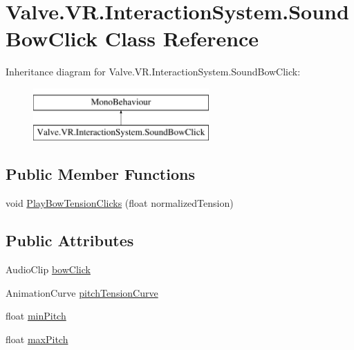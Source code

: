 \hypertarget{class_valve_1_1_v_r_1_1_interaction_system_1_1_sound_bow_click}{}\section{Valve.\+V\+R.\+Interaction\+System.\+Sound\+Bow\+Click Class Reference}
\label{class_valve_1_1_v_r_1_1_interaction_system_1_1_sound_bow_click}
Inheritance diagram for Valve.\+V\+R.\+Interaction\+System.\+Sound\+Bow\+Click\+:\begin{figure}[H]
\begin{center}
\leavevmode
\includegraphics[height=2.000000cm]{class_valve_1_1_v_r_1_1_interaction_system_1_1_sound_bow_click}
\end{center}
\end{figure}
\subsection*{Public Member Functions}
\begin{DoxyCompactItemize}
\item 
void \mbox{\hyperlink{class_valve_1_1_v_r_1_1_interaction_system_1_1_sound_bow_click_a6bf68c8fbc92f67a09ac3f3bf2e03806}{Play\+Bow\+Tension\+Clicks}} (float normalized\+Tension)
\end{DoxyCompactItemize}
\subsection*{Public Attributes}
\begin{DoxyCompactItemize}
\item 
Audio\+Clip \mbox{\hyperlink{class_valve_1_1_v_r_1_1_interaction_system_1_1_sound_bow_click_ac1af3f10e0917cc1d2515b535f69f6f5}{bow\+Click}}
\item 
Animation\+Curve \mbox{\hyperlink{class_valve_1_1_v_r_1_1_interaction_system_1_1_sound_bow_click_a379b7305e72c24dce2fc8d090942cfd8}{pitch\+Tension\+Curve}}
\item 
float \mbox{\hyperlink{class_valve_1_1_v_r_1_1_interaction_system_1_1_sound_bow_click_aebdbcd3d60d93171d2081e215a22992e}{min\+Pitch}}
\item 
float \mbox{\hyperlink{class_valve_1_1_v_r_1_1_interaction_system_1_1_sound_bow_click_acd24d609cdf6ce844595809da4fdb415}{max\+Pitch}}
\end{DoxyCompactItemize}


